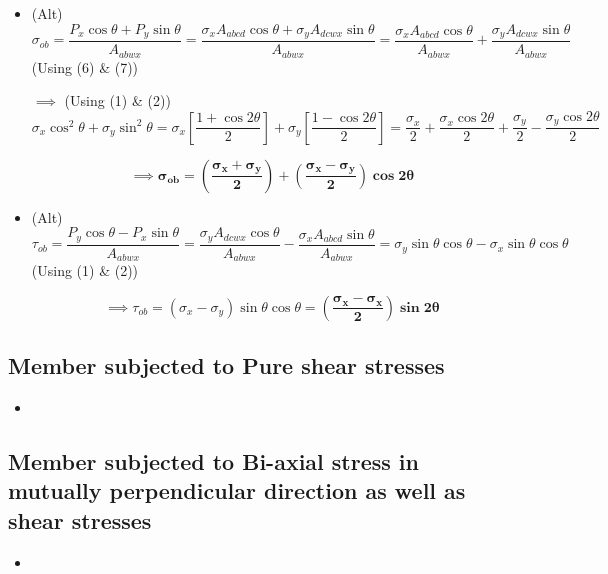 \documentclass[8pt]{report}
\begin{document}
\begin{itemize}
			\item (Alt)$\sigma_{ob} = \dfrac{P_x\cos\theta + P_y\sin\theta}{A_{abwx}} = \dfrac{\sigma_xA_{abcd}\cos\theta + \sigma_yA_{dcwx}\sin\theta}{A_{abwx}} = \dfrac{\sigma_xA_{abcd}\cos\theta}{A_{abwx}}+\dfrac{\sigma_yA_{dcwx}\sin\theta}{A_{abwx}}$ (Using (6) \& (7))
			\item[$\implies$] (Using (1) \& (2)) $\sigma_x\cos^2\theta + \sigma_y\sin^2\theta = \sigma_x\left[\dfrac{1+\cos 2\theta}{2}\right] + \sigma_y\left[\dfrac{1-\cos 2\theta}{2}\right] = \dfrac{\sigma_x}{2}+\dfrac{\sigma_x\cos 2\theta}{2}+\dfrac{\sigma_y}{2}-\dfrac{\sigma_y\cos 2\theta}{2}$ 
			\item[] $$\implies \boxed{\pmb{\sigma_{ob} = \left(\dfrac{\sigma_x+\sigma_y}{2}\right)+\left(\dfrac{\sigma_x-\sigma_y}{2}\right)\cos 2\theta}}$$
			\item (Alt)$\tau_{ob} = \dfrac{P_y\cos\theta-P_x\sin\theta}{A_{abwx}} = \dfrac{\sigma_yA_{dcwx}\cos\theta}{A_{abwx}}-\dfrac{\sigma_xA_{abcd}\sin\theta}{A_{abwx}} = \sigma_y\sin\theta\cos\theta - \sigma_x\sin\theta\cos\theta$ (Using (1) \& (2))
			\item[] $$\implies \boxed{\tau_{ob} = (\sigma_x-\sigma_y)\sin\theta\cos\theta = \pmb{\left(\dfrac{\sigma_x-\sigma_x}{2}\right)\sin 2\theta}}$$
		\end{itemize}
	\subsection{Member subjected to Pure shear stresses}
		\begin{itemize}
			\item
		\end{itemize}
	\subsection{Member subjected to Bi-axial stress in mutually perpendicular direction as well as shear stresses}
		\begin{itemize}
			\item
		\end{itemize}
\end{document}

